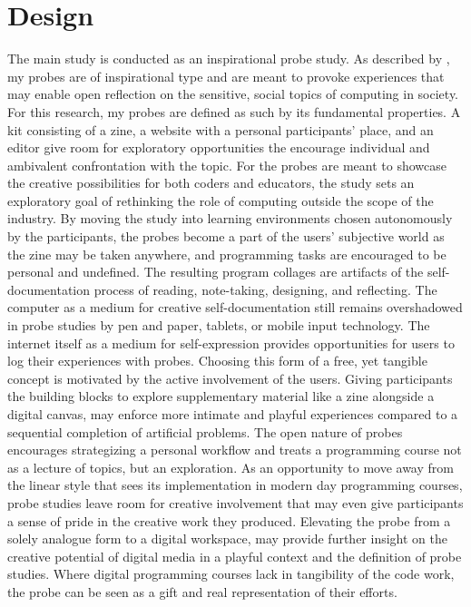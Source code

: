 \section{Design}
The main study is conducted as an inspirational probe study.  As described by \citep{mattelmäki:2005}, my probes are of inspirational type and are meant to provoke experiences that may enable open reflection on the sensitive, social topics of computing in society. For this research, my probes are defined as such by its fundamental properties. A kit consisting of a zine, a website with a personal participants' place, and an editor give room for exploratory opportunities the encourage individual and ambivalent confrontation with the topic. For the probes are meant to showcase the creative possibilities for both coders and educators, the study sets an exploratory goal of rethinking the role of computing outside the scope of the industry. By moving the study into learning environments chosen autonomously by the participants, the probes become a part of the users' subjective world as the zine may be taken anywhere, and programming tasks are encouraged to be personal and undefined. The resulting program collages are artifacts of the self-documentation process of reading, note-taking, designing, and reflecting. The computer as a medium for creative self-documentation still remains overshadowed in probe studies by pen and paper, tablets, or mobile input technology. The internet itself as a medium for self-expression provides opportunities for users to log their experiences with probes.
Choosing this form of a free, yet tangible concept is motivated by the active involvement of the users. Giving participants the building blocks to explore supplementary material like a zine alongside a digital canvas, may enforce more intimate and playful experiences compared to a sequential completion of artificial problems. The open nature of probes encourages strategizing a personal workflow and treats a programming course not as a lecture of topics, but an exploration. As an opportunity to move away from the linear style that sees its implementation in modern day programming courses, probe studies leave room for creative involvement that may even give participants a sense of pride in the creative work they produced. Elevating the probe from a solely analogue form to a digital workspace, may provide further insight on the creative potential of digital media in a playful context and the definition of probe studies. Where digital programming courses lack in tangibility of the code work, the probe can be seen as a gift and real representation of their efforts. \\ \\
